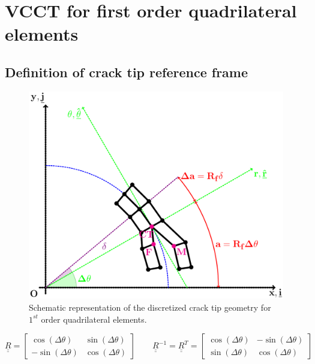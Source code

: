 \documentclass[a4paper]{jpconf}
\begin{document}
\clearpage

\section{VCCT for first order quadrilateral elements}

\subsection{Definition of crack tip reference frame}

\begin{figure}[!h]
\includegraphics[width=\textwidth]{VCCT-linear.pdf}
\caption{Schematic representation of the discretized crack tip geometry for  $1^{st}$ order quadrilateral elements.}
\end{figure}

\begin{equation}
\underline{\underline{R}}=\begin{bmatrix}
\cos\left(\Delta\theta\right) & \sin\left(\Delta\theta\right) \\
-\sin\left(\Delta\theta\right) & \cos\left(\Delta\theta\right)
\end{bmatrix}\qquad\underline{\underline{R}}^{-1}=\underline{\underline{R}}^{T}=\begin{bmatrix}
\cos\left(\Delta\theta\right) & -\sin\left(\Delta\theta\right) \\
\sin\left(\Delta\theta\right) & \cos\left(\Delta\theta\right)
\end{bmatrix}
\end{equation}
\end{document}
